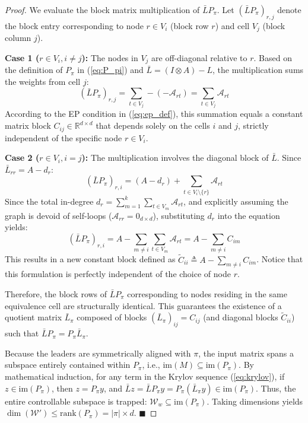 \documentclass[10pt,a4paper]{amsart}
\begin{document}
	\begin{proof}
		We evaluate the block matrix multiplication of $\bar{L} P_\pi$. Let $(\bar{L} P_\pi)_{r, j}$ denote the block entry corresponding to node $r \in V_i$ (block row $r$) and cell $V_j$ (block column $j$). 
		
		\textbf{Case 1 ($r \in V_i, i \neq j$):} The nodes in $V_j$ are off-diagonal relative to $r$. Based on the definition of $P_\pi$ in (\ref{eq:P_pi}) and $\bar{L} = (I \otimes A) - L$, the multiplication sums the weights from cell $j$:
		\begin{equation}
			(\bar{L} P_\pi)_{r, j} = \sum_{t \in V_j} -(-\mathcal{A}_{rt}) = \sum_{t \in V_j} \mathcal{A}_{rt}
		\end{equation}
		According to the EP condition in (\ref{eq:ep_def}), this summation equals a constant matrix block $C_{ij} \in \mathbb{R}^{d \times d}$ that depends solely on the cells $i$ and $j$, strictly independent of the specific node $r \in V_i$.
		
		\textbf{Case 2 ($r \in V_i, i = j$):} The multiplication involves the diagonal block of $\bar{L}$. Since $\bar{L}_{rr} = A - d_r$:
		\begin{equation}
			(\bar{L} P_\pi)_{r, i} = (A - d_r) + \sum_{t \in V_i \setminus \{r\}} \mathcal{A}_{rt}
		\end{equation}
		Since the total in-degree $d_r = \sum_{m=1}^k \sum_{t \in V_m} \mathcal{A}_{rt}$, and explicitly assuming the graph is devoid of self-loops ($\mathcal{A}_{rr} = 0_{d \times d}$), substituting $d_r$ into the equation yields:
		\begin{equation}
			(\bar{L} P_\pi)_{r, i} = A - \sum_{m \neq i} \sum_{t \in V_m} \mathcal{A}_{rt} = A - \sum_{m \neq i} C_{im}
		\end{equation}
		This results in a new constant block defined as $\tilde{C}_{ii} \triangleq A - \sum_{m \neq i} C_{im}$. Notice that this formulation is perfectly independent of the choice of node $r$. 
		
		Therefore, the block rows of $\bar{L} P_\pi$ corresponding to nodes residing in the same equivalence cell are structurally identical. This guarantees the existence of a quotient matrix $\bar{L}_\pi$ composed of blocks $(\bar{L}_\pi)_{ij} = C_{ij}$ (and diagonal blocks $\tilde{C}_{ii}$) such that $\bar{L} P_\pi = P_\pi \bar{L}_\pi$. 
		
		Because the leaders are symmetrically aligned with $\pi$, the input matrix spans a subspace entirely contained within $P_\pi$, i.e., $\text{im}(M) \subseteq \text{im}(P_\pi)$. By mathematical induction, for any term in the Krylov sequence (\ref{eq:krylov}), if $z \in \text{im}(P_\pi)$, then $z = P_\pi y$, and $\bar{L} z = \bar{L} P_\pi y = P_\pi (\bar{L}_\pi y) \in \text{im}(P_\pi)$. Thus, the entire controllable subspace is trapped: $\mathcal{W}_w \subseteq \text{im}(P_\pi)$. Taking dimensions yields $\dim(\mathcal{W}') \le \text{rank}(P_\pi) = |\pi| \times d$. \hfill $\blacksquare$
	\end{proof}
\end{document}
